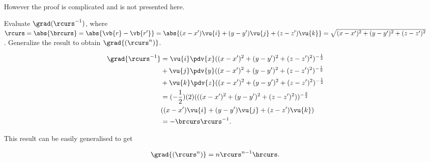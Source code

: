 \documentclass[english,a4paper,12pt]{report}
\begin{document}
However the proof is complicated and is not presented here.

{Evaluate \(\grad({\rcurs ^{-1} })\), where \(\rcurs = \abs{\brcurs} = \abs{\vb{r} - \vb{r'}} = \abs{(x - x')\vu{i} + (y - y')\vu{j} + (z - z')\vu{k}} = \sqrt{(x-x')^2+(y-y')^2+(z-z')^2}\). Generalize the result to obtain \(\grad{(\rcurs^n)}\).}
{\begin{equation} 
	\begin{aligned} 
		\grad{\rcurs ^{-1} } &= \vu{i}\pdv{x}((x - x')^2 + (y - y')^2 + (z - z')^2)^{-\frac{1}{2}} \\ &+ \vu{j}\pdv{y}((x - x')^2 + (y - y')^2 + (z - z')^2)^{-\frac{1}{2}} \\ &+ \vu{k}\pdv{z}((x - x')^2 + (y - y')^2 + (z - z')^2)^{-\frac{1}{2}} \\ &= (-\frac{1}{2})(2)(((x - x')^2 + (y - y')^2 + (z - z')^2))^{-\frac{3}{2}} \\ &((x - x')\vu{i} + (y - y')\vu{j} + (z - z')\vu{k}) \\ &=- \brcurs \rcurs ^{-1} . 
	\end{aligned} 
\end{equation}
		
This result can be easily generalised to get
		
\begin{equation} 
	\grad{(\rcurs^n)} = n\rcurs^{n-1}\hrcurs. \label{gradrcurs} 
\end{equation}}
\end{document}
